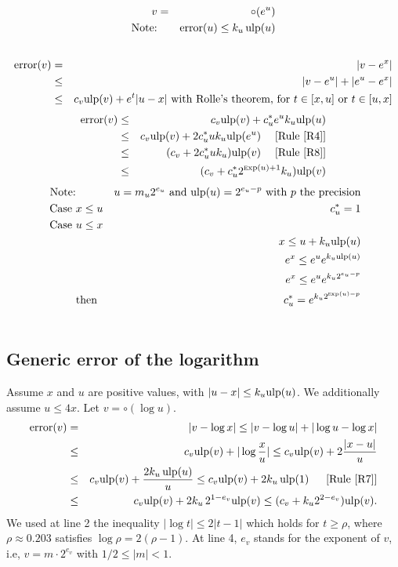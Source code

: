\documentclass[12pt]{amsart}
\def\n{\textnormal}
\def\ulp{{\rm ulp}}
\def\Exp{{\rm \textsc exp}}
\newcommand{\U}[1]{\quad \mbox{[Rule~\ref{#1}]}}
\DeclareMathOperator{\error}{error}
\begin{document}
\begin{eqnarray}\nonumber
v&=&\circ(e^{u}) \\\nonumber
\textnormal{Note:}&& \error(u) \leq k_u \, \ulp(u)\\\nonumber
\end{eqnarray}
\begin{eqnarray}\nonumber
\error(v)& = &|v - e^{x}| \\\nonumber
& \leq &|v - e^{u}| +|e^{u} - e^{x}| \\\nonumber
& \leq & c_v \ulp(v) +  e^t |u-x| \n{ with Rolle's theorem, for } t\in[x,u]\n{ or }t\in[u,x]
\end{eqnarray}
\begin{eqnarray}\nonumber
\error(v)& \leq & c_v \ulp(v) +  c_u^* e^u k_u \ulp(u) \\\nonumber
& \leq & c_v \ulp(v) +  2 c_u^* u k_u \ulp(e^u) \;\U{R4}\\\nonumber
& \leq & (c_v +  2 c_u^* u k_u )\ulp(v) \;\U{R8}\\\nonumber
& \leq & (c_v +  c_u^* 2^{\Exp(u)+1} k_u )\ulp(v)
\end{eqnarray}
\begin{eqnarray}\nonumber
\textnormal{Note:}&& u= m_u 2^{e_u} \n{ and }\ulp(u)=2^{e_u-p} \n{ with } p \n{ the precision} \\\nonumber
\n{ Case }&x \leq u&  c_u^* =1 \\\nonumber
\n{ Case }&u \leq x& \\\nonumber
&&  x \leq u + k_u \ulp(u)\\\nonumber
&& e^x \leq e^u e^{k_u \ulp(u)}\\\nonumber
&&e^x \leq e^u e^{k_u 2^{e_u-p}}\\\nonumber
&\n{then}& c_u^* = e^{k_u 2^{\Exp(u)-p}}\\\nonumber
\end{eqnarray}

\subsection{Generic error of the logarithm}\label{generic:log}
Assume $x$ and $u$ are positive values,
with $|u - x| \leq k_u \ulp(u)$.
We additionally assume $u \leq 4x$. Let $v = \circ(\log u)$.
\begin{eqnarray}\nonumber
\error(v)& = &|v - \log x|
  \leq |v - \log u| +|\log u - \log x| \\\nonumber
& \leq & c_v \ulp(v) + |\log\frac{x}{u}|
  \leq   c_v \ulp(v) + 2 \frac{|x-u|}{u} \\\nonumber
& \leq & c_v \ulp(v) + \frac{2 k_u \, \ulp(u)}{u}
  \leq   c_v \ulp(v) + 2 k_u \, \ulp(1)\;\; \U{R7}\\\nonumber
& \leq & c_v \ulp(v) + 2 k_u \, 2^{1-e_v} \ulp(v)
  \leq   (c_v + k_u 2^{2-e_v}) \ulp(v).
\end{eqnarray}
We used at line 2 the inequality $|\log t| \leq 2 |t-1|$ which holds
for $t \geq \rho$, where $\rho \approx 0.203$ satisfies $\log \rho =2(\rho-1)$.
At line 4, $e_v$ stands for the exponent of $v$, i.e,
$v = m \cdot 2^{e_v}$ with $1/2 \leq |m| < 1$.
\end{document}
